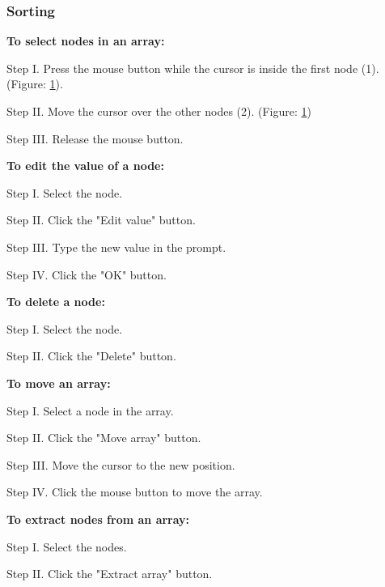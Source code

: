 \subsubsection{Sorting}

\textbf{To select nodes in an array:}
\begin{figure}[H]
    \centering
    \setlength{\fboxsep}{0pt}
    \setlength{\fboxrule}{1pt}
    \caption{}
    \label{fig:selectNodes}	
\end{figure}
\begin{userManualItemlist}
    \item[Step I.] Press the mouse button while the cursor is inside the first node (1). (Figure: \ref{fig:selectNodes}).
    \item[Step II.] Move the cursor over the other nodes (2). (Figure: \ref{fig:selectNodes})
    \item[Step III.] Release the mouse button.
\end{userManualItemlist}

\textbf{To edit the value of a node:}
\begin{userManualItemlist}
    \item[Step I.] Select the node.
    \item[Step II.]  Click the "Edit value" button.
    \item[Step III.] Type the new value in the prompt.
    \item[Step IV.] Click the "OK" button.  
\end{userManualItemlist}

\textbf{To delete a node:}
\begin{userManualItemlist}
    \item[Step I.] Select the node.
    \item[Step II.] Click the "Delete" button. 
\end{userManualItemlist}

\textbf{To move an array:}
\begin{userManualItemlist}
    \item[Step I.] Select a node in the array.
    \item[Step II.] Click the "Move array" button.
    \item[Step III.] Move the cursor to the new position.
    \item[Step IV.] Click the mouse button to move the array.   
\end{userManualItemlist}

\textbf{To extract nodes from an array:}
\begin{userManualItemlist}
    \item[Step I.] Select the nodes.
    \item[Step II.] Click the "Extract array" button.
\end{userManualItemlist}
